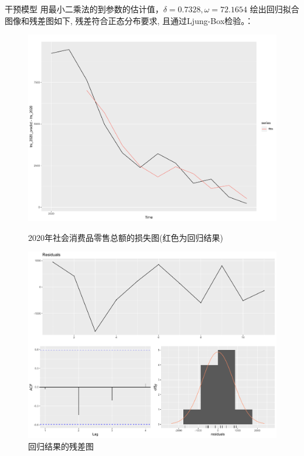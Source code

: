 \documentclass[10pt]{beamer}
\begin{document}
\begin{frame}{干预模型}
  用最小二乘法的到参数的估计值，\(\delta =0.7328 , \omega =  72.1654 \)
  绘出回归拟合图像和残差图如下, 残差符合正态分布要求, 且通过Ljung-Box检验。：
  \begin{figure}[H] %
    \centering %
    \begin{minipage}[t]{0.48\textwidth}
      \centering
      \includegraphics[width=1\textwidth]{figures/fitted_loss_2020.pdf} %
      \caption{2020年社会消费品零售总额的损失图(红色为回归结果)} %
      \label{fitted_loss_2020} %
    \end{minipage}
    \begin{minipage}[t]{0.48\textwidth}
      \centering %
      \includegraphics[width=1\textwidth]{figures/loss_model_resi.pdf} %
      \caption{回归结果的残差图} %
      \label{loss_model_resi} %
    \end{minipage}
  \end{figure} 
\end{frame}
\end{document}
